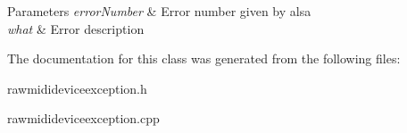 \begin{DoxyParams}{Parameters}
{\em error\-Number} & Error number given by alsa \\
\hline
{\em what} & Error description \\
\hline
\end{DoxyParams}


The documentation for this class was generated from the following files\-:\begin{DoxyCompactItemize}
\item 
rawmidideviceexception.\-h\item 
rawmidideviceexception.\-cpp\end{DoxyCompactItemize}
